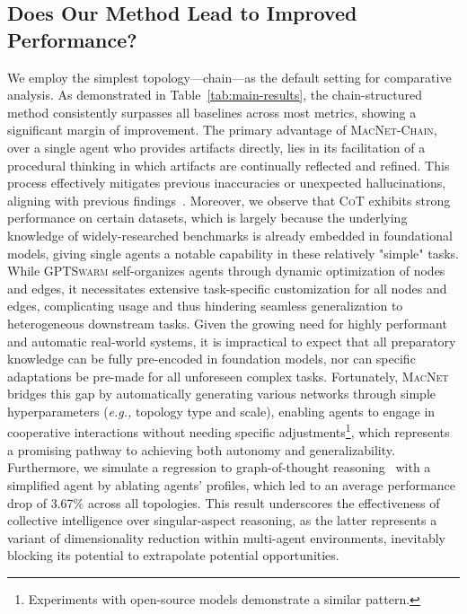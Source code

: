 \documentclass{article}
\newcommand{\eg}{\textit{e.g., }}
\begin{document}
\subsection{Does Our Method Lead to Improved Performance?}

We employ the simplest topology—chain—as the default setting for comparative analysis. As demonstrated in Table~\ref{tab:main-results}, the chain-structured method consistently surpasses all baselines across most metrics, showing a significant margin of improvement.
The primary advantage of \textsc{MacNet-Chain}, over a single agent who provides artifacts directly, lies in its facilitation of a procedural thinking in which artifacts are continually reflected and refined. This process effectively mitigates previous inaccuracies or unexpected hallucinations, aligning with previous findings~\citep{Cohen2023LM,Du2024Improving,Qian2024Iterative}.
Moreover, we observe that \textsc{CoT} exhibits strong performance on certain datasets, which is largely because the underlying knowledge of widely-researched benchmarks is already embedded in foundational models, giving single agents a notable capability in these relatively "simple" tasks. 
While \textsc{GPTSwarm} self-organizes agents through dynamic optimization of nodes and edges, it necessitates extensive task-specific customization for all nodes and edges, complicating usage and thus hindering seamless generalization to heterogeneous downstream tasks.
Given the growing need for highly performant and automatic real-world systems, it is impractical to expect that all preparatory knowledge can be fully pre-encoded in foundation models, nor can specific adaptations be pre-made for all unforeseen complex tasks. 
Fortunately, \textsc{MacNet} bridges this gap by automatically generating various networks through simple hyperparameters (\eg topology type and scale), enabling agents to engage in cooperative interactions without needing specific adjustments\footnote{Experiments with open-source models demonstrate a similar pattern.}, which represents a promising pathway to achieving both autonomy and generalizability.
Furthermore, we simulate a regression to graph-of-thought reasoning~\citep{besta2024graph} with a simplified agent by ablating agents' profiles, which led to an average performance drop of 3.67\% across all topologies. This result underscores the effectiveness of collective intelligence over singular-aspect reasoning, as the latter represents a variant of dimensionality reduction within multi-agent environments, inevitably blocking its potential to extrapolate potential opportunities.
\end{document}
